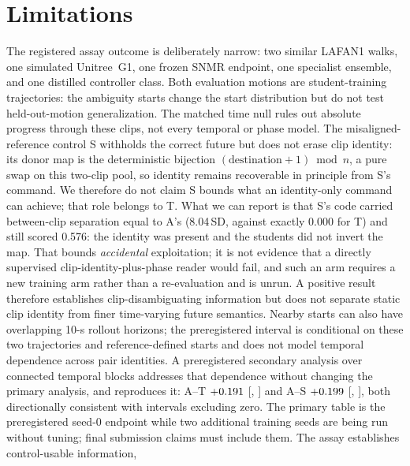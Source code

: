 \documentclass[conference]{IEEEtran}
\newif\ifethreeseed
\newif\ifeexplicitvalid
\newif\ifepositivecontent
\newcommand{\EShuffledAmb}{0.576}
\begin{document}
\section{Limitations}\label{sec:limits}
The \ifepositivecontent positive content result\else registered assay outcome\fi{} is
deliberately narrow: two similar LAFAN1 walks, one
simulated Unitree~G1, one frozen SNMR endpoint, one specialist ensemble, and one
distilled controller class.  Both evaluation motions are student-training trajectories:
the ambiguity starts change the start distribution but do not test held-out-motion
generalization.  The matched time null rules out absolute progress through
these clips, not every temporal or phase model.  The misaligned-reference control S
withholds the correct future but does not erase clip identity: its donor map is the
deterministic bijection $(\mathrm{destination}+1)\bmod n$, a pure swap on this two-clip
pool, so identity remains recoverable in principle from S's command.  We therefore do not
claim S bounds what an identity-only command can achieve; that role belongs to T.  What we
can report is that S's code carried between-clip separation equal to A's (8.04\,SD, against
exactly 0.000 for T) and still scored \EShuffledAmb{}: the identity was present and the
students did not invert the map.  That bounds \emph{accidental} exploitation; it is not
evidence that a directly supervised clip-identity-plus-phase reader would fail, and such an
arm requires a new training arm rather than a re-evaluation and is unrun.  A positive result
therefore establishes clip-disambiguating information but does not separate static clip
identity from finer time-varying future semantics.  Nearby starts can also have overlapping 10-s rollout
horizons; the preregistered interval is conditional on these two trajectories and
\ESelectedWindows{} reference-defined starts and does not model temporal dependence across
pair identities.  A preregistered secondary analysis over \ETemporalBlocks{} connected
temporal blocks addresses that dependence without changing the primary analysis, and
reproduces it: A--T $+0.191$
[\ETemporalATCILow, \ETemporalATCIHigh] and A--S $+0.199$
[\ETemporalASCILow, \ETemporalASCIHigh], both directionally consistent with intervals
excluding zero.
\ifethreeseed The primary table is the
preregistered three-seed aggregate.\else The primary table is the preregistered seed-0
endpoint while two additional training seeds are being run without tuning; final
submission claims must include them.\fi{}
\ifeexplicitvalid\ifepositivecontent The assay establishes control-usable information,
\end{document}
